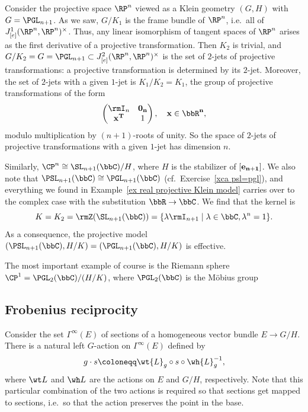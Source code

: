 \begin{example}
    Consider the projective space $\RP^n$ viewed as a Klein geometry $(G,H)$ with $G=\PGL_{n+1}$. As we saw, $G\slash K_1$ is the frame bundle of $\RP^n$, i.e.\ all of $J^1_{[e]}(\RP^n,\RP^n)^\times$. Thus, any linear isomorphism of tangent spaces of $\RP^n$ arises as the first derivative of a projective transformation. Then $K_2$ is trivial, and $G\slash K_2=G=\PGL_{n+1}\subset J^2_{[e]}(\RP^n,\RP^n)^\times$ is the set of $2$-jets of projective transformations: a projective transformation is determined by its $2$-jet. Moreover, the set of $2$-jets with a given $1$-jet is $K_1\slash K_2=K_1$, the group of projective transformations of the form 
    \[\begin{pmatrix}
        \rmI_n & \bf{0}_n\\
        \bf{x}^T & 1
    \end{pmatrix},\quad \bf{x}\in\bbR^n,\]
    modulo multiplication by $(n+1)$-roots of unity.  So the space of $2$-jets of projective transformations with a given $1$-jet has dimension $n$.
\end{example}

\begin{example}
    Similarly, $\CP^n\cong \SL_{n+1}(\bbC)\slash H$, where $H$ is the stabilizer of $[\bf{e}_{n+1}]$. We also note that $\PSL_{n+1}(\bbC)\cong \PGL_{n+1}(\bbC)$ (cf.\ Exercise~\ref{xca psl=pgl}), and everything we found in Example~\ref{ex real projective Klein model} carries over to the complex case with the substitution $\bbR \to \bbC$. We find that the kernel is 
    \[K=K_2=\rmZ(\SL_{n+1}(\bbC))=\{\lambda \rmI_{n+1}\mid \lambda\in\bbC ,\lambda^n=1\}.\]
    As a consequence, the projective model $(\PSL_{n+1}(\bbC),H\slash K)=(\PGL_{n+1}(\bbC),H\slash K)$ is effective. 

    The most important example of course is the Riemann sphere $\CP^1=\PGL_2(\bbC)\slash (H\slash K)$, where $\PGL_2(\bbC)$ is the M\"obius group 
\end{example}







\subsection{Frobenius reciprocity}\label{sec: Frobenius reciprocity}

Consider the set $\Gamma^\infty(E)$ of sections of a homogeneous vector bundle $E\to G\slash H$. There is a natural left $G$-action on $\Gamma^\infty(E)$ defined by
\[g\cdot s\coloneqq \wt{L}_g\circ s\circ\wh{L}^{-1}_g,\]
where $\wt L$ and $\wh L$ are the actions on $E$ and $G\slash H$, respectively. Note that this particular combination of the two actions is required so that sections get mapped to sections, i.e.\ so that the action preserves the point in the base.

